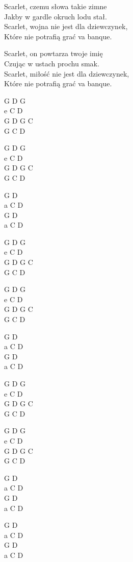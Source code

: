 \begin{text}
    \vin Scarlet, czemu słowa takie zimne\\
    \vin Jakby w gardle okruch lodu stał.\\
    \vin Scarlet, wojna nie jest dla dziewczynek,\\
    \vin Które nie potrafią grać va banque.

    \vin Scarlet, on powtarza twoje imię\\
    \vin Czując w ustach prochu smak.\\
    \vin Scarlet, miłość nie jest dla dziewczynek,\\
    \vin Które nie potrafią grać va banque.

\end{text}
\begin{chord}
    G D G\\ 
    e C D\\
    G D G C\\
    G C D

    G D G\\
    e C D\\
    G D G C\\
    G C D

    G D\\
    a C D\\
    G D\\
    a C D

    G D G\\ 
    e C D\\
    G D G C\\
    G C D

    G D G\\
    e C D\\
    G D G C\\
    G C D

    G D\\
    a C D\\
    G D\\
    a C D

    G D G\\ 
    e C D\\
    G D G C\\
    G C D

    G D G\\
    e C D\\
    G D G C\\
    G C D

    G D\\
    a C D\\
    G D\\
    a C D

    G D\\
    a C D\\
    G D\\
    a C D
\end{chord}